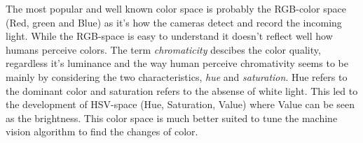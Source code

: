 The most popular and well known color space is probably the RGB-color space (Red, green and Blue) as it's how the cameras detect and record the incoming light. While the RGB-space is easy to understand it doesn't reflect well how humans perceive colors. The term \textit{chromaticity} descibes the color quality, regardless it's luminance and the way human perceive chromativity seems to be mainly by considering the two characteristics, \textit{hue} and \textit{saturation}. Hue refers to the dominant color and saturation refers to the absense of white light. This led to the development of HSV-space (Hue, Saturation, Value) where Value can be seen as the brightness. This color space is much better suited to tune the machine vision algorithm to find the changes of color. 
